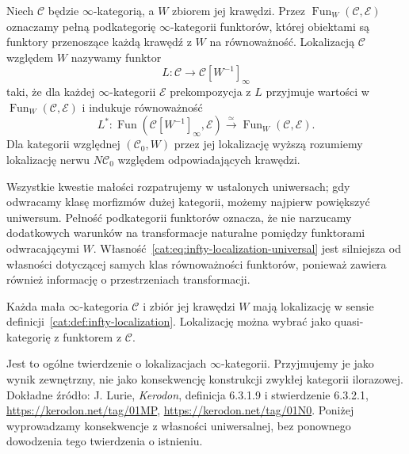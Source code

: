 \begin{definicja}\label{cat:def:infty-localization}
Niech $\mathcal C$ będzie $\infty$-kategorią, a $W$ zbiorem jej krawędzi. Przez $\operatorname{Fun}_W(\mathcal C,\mathcal E)$ oznaczamy pełną podkategorię $\infty$-kategorii funktorów, której obiektami są funktory przenoszące każdą krawędź z $W$ na równoważność. Lokalizacją $\mathcal C$ względem $W$ nazywamy funktor
\[
 L:\mathcal C\to\mathcal C[W^{-1}]_\infty
\]
taki, że dla każdej $\infty$-kategorii $\mathcal E$ prekompozycja z $L$ przyjmuje wartości w $\operatorname{Fun}_W(\mathcal C,\mathcal E)$ i indukuje równoważność
\begin{equation}\label{cat:eq:infty-localization-universal}
 L^*:\operatorname{Fun}(\mathcal C[W^{-1}]_\infty,\mathcal E)
 \xrightarrow{\ \simeq\ }\operatorname{Fun}_W(\mathcal C,\mathcal E).
\end{equation}
Dla kategorii względnej $(\mathcal C_0,W)$ przez jej lokalizację wyższą rozumiemy lokalizację nerwu $N\mathcal C_0$ względem odpowiadających krawędzi.
\end{definicja}

Wszystkie kwestie małości rozpatrujemy w ustalonych uniwersach; gdy odwracamy klasę morfizmów dużej kategorii, możemy najpierw powiększyć uniwersum. Pełność podkategorii funktorów oznacza, że nie narzucamy dodatkowych warunków na transformacje naturalne pomiędzy funktorami odwracającymi $W$. Własność~\eqref{cat:eq:infty-localization-universal} jest silniejsza od własności dotyczącej samych klas równoważności funktorów, ponieważ zawiera również informację o przestrzeniach transformacji.

\begin{twierdzenie}\label{cat:thm:infty-localization-exists}
Każda mała $\infty$-kategoria $\mathcal C$ i zbiór jej krawędzi $W$ mają lokalizację w sensie definicji~\ref{cat:def:infty-localization}. Lokalizację można wybrać jako quasi-kategorię z funktorem z $\mathcal C$.
\end{twierdzenie}

Jest to ogólne twierdzenie o lokalizacjach $\infty$-kategorii. Przyjmujemy je jako wynik zewnętrzny, nie jako konsekwencję konstrukcji zwykłej kategorii ilorazowej. Dokładne źródło: J. Lurie, \emph{Kerodon}, definicja 6.3.1.9 i stwierdzenie 6.3.2.1, \url{https://kerodon.net/tag/01MP}, \url{https://kerodon.net/tag/01N0}. Poniżej wyprowadzamy konsekwencje z własności uniwersalnej, bez ponownego dowodzenia tego twierdzenia o istnieniu.

